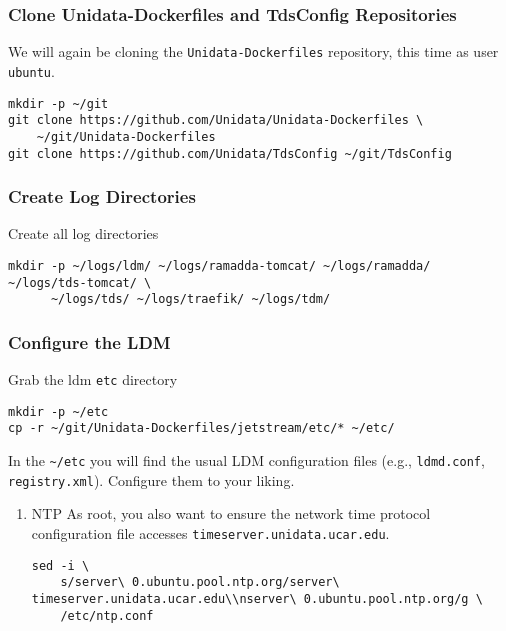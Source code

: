 \documentclass[onecolumn,9pt]{article}
\begin{document}
\subsubsection{Clone Unidata-Dockerfiles and TdsConfig Repositories}
\label{sec:orgheadline19}

We will again be cloning the \texttt{Unidata-Dockerfiles} repository, this time as user \texttt{ubuntu}.

\lstset{frame=lines,basicstyle=\footnotesize,numbers=left,numberstyle=\tiny,language=sh,label= ,caption= ,captionpos=b}
\begin{lstlisting}
mkdir -p ~/git
git clone https://github.com/Unidata/Unidata-Dockerfiles \
    ~/git/Unidata-Dockerfiles
git clone https://github.com/Unidata/TdsConfig ~/git/TdsConfig
\end{lstlisting}

\subsubsection{Create Log Directories}
\label{sec:orgheadline20}

Create all log directories

\lstset{frame=lines,basicstyle=\footnotesize,numbers=left,numberstyle=\tiny,language=sh,label= ,caption= ,captionpos=b}
\begin{lstlisting}
mkdir -p ~/logs/ldm/ ~/logs/ramadda-tomcat/ ~/logs/ramadda/ ~/logs/tds-tomcat/ \
      ~/logs/tds/ ~/logs/traefik/ ~/logs/tdm/
\end{lstlisting}

\subsubsection{Configure the LDM}
\label{sec:orgheadline22}

Grab the ldm \texttt{etc} directory

\lstset{frame=lines,basicstyle=\footnotesize,numbers=left,numberstyle=\tiny,language=sh,label= ,caption= ,captionpos=b}
\begin{lstlisting}
mkdir -p ~/etc
cp -r ~/git/Unidata-Dockerfiles/jetstream/etc/* ~/etc/
\end{lstlisting}

In the \texttt{\textasciitilde{}/etc} you will find the usual LDM configuration files (e.g., \texttt{ldmd.conf}, \texttt{registry.xml}). Configure them to your liking.

\begin{enumerate}
\item NTP
\label{sec:orgheadline21}
As root, you also want to ensure the network time protocol configuration file accesses \texttt{timeserver.unidata.ucar.edu}.

\lstset{frame=lines,basicstyle=\footnotesize,numbers=left,numberstyle=\tiny,language=sh,label= ,caption= ,captionpos=b}
\begin{lstlisting}
sed -i \
    s/server\ 0.ubuntu.pool.ntp.org/server\ timeserver.unidata.ucar.edu\\nserver\ 0.ubuntu.pool.ntp.org/g \
    /etc/ntp.conf
\end{lstlisting}
\end{enumerate}
\end{document}
